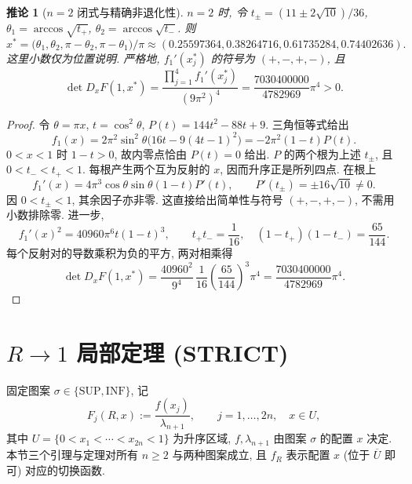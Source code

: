 \documentclass[UTF8]{ctexart}
\newtheorem{corollary}[theorem]{推论}
\begin{document}
\begin{corollary}[$n=2$ 闭式与精确非退化性]\label{cor:r1n2}
$n=2$ 时, 令 $t_\pm=(11\pm2\sqrt{10})/36$,
$\theta_1=\arccos\sqrt{t_+}$, $\theta_2=\arccos\sqrt{t_-}$. 则
\begin{equation*}
x^*=\bigl(\theta_1,\theta_2,\pi-\theta_2,\pi-\theta_1\bigr)/\pi
\approx(0.25597364,0.38264716,0.61735284,0.74402636).
\end{equation*}
这里小数仅为位置说明. 严格地, $f_1'(x_j^*)$ 的符号为 $(+,-,+,-)$, 且
\begin{equation}\label{eq:n2det-exact}
\det D_xF(1,x^*)=\frac{\prod_{j=1}^4 f_1'(x_j^*)}{(9\pi^2)^4}
=\frac{7030400000}{4782969}\pi^4>0.
\end{equation}
\end{corollary}
\begin{proof}
令 $\theta=\pi x$, $t=\cos^2\theta$, $P(t)=144t^2-88t+9$. 三角恒等式给出
\begin{equation*}
f_1(x)=2\pi^2\sin^2\theta\bigl(16t-9(4t-1)^2\bigr)
=-2\pi^2(1-t)P(t).
\end{equation*}
$0<x<1$ 时 $1-t>0$, 故内零点恰由 $P(t)=0$ 给出.
$P$ 的两个根为上述 $t_\pm$, 且 $0<t_-<t_+<1$. 每根产生两个互为反射的
$x$, 因而升序正是所列四点. 在根上
\begin{equation*}
f_1'(x)=4\pi^3\cos\theta\sin\theta(1-t)P'(t),\qquad
P'(t_\pm)=\pm16\sqrt{10}\ne0.
\end{equation*}
因 $0<t_\pm<1$, 其余因子亦非零. 这直接给出简单性与符号 $(+,-,+,-)$,
不需用小数排除零. 进一步,
\begin{equation*}
f_1'(x)^2=40960\pi^6 t(1-t)^3,\qquad
t_+t_-=\frac1{16},\quad (1-t_+)(1-t_-)=\frac{65}{144}.
\end{equation*}
每个反射对的导数乘积为负的平方, 两对相乘得
\begin{equation*}
\det D_xF(1,x^*)=
\frac{40960^2}{9^4}\,\frac1{16}\left(\frac{65}{144}\right)^3\pi^4
=\frac{7030400000}{4782969}\pi^4.
\end{equation*}
\end{proof}

\section{\texorpdfstring{$R\to1$}{R to 1} 局部定理 (STRICT)}\label{sec:local}

固定图案 $\sigma\in\{\mathrm{SUP},\mathrm{INF}\}$, 记
\begin{equation*}
	F_j(R,x):=\frac{f(x_j)}{\lambda_{n+1}},\qquad
	j=1,\dots,2n,\quad x\in U,
\end{equation*}
其中 $U=\{0<x_1<\cdots<x_{2n}<1\}$ 为升序区域, $f,\lambda_{n+1}$ 由图案
$\sigma$ 的配置 $x$ 决定. 本节三个引理与定理对所有 $n\ge2$ 与两种图案成立,
且 $f_R$ 表示配置 $x$ (位于 $\overline U$ 即可) 对应的切换函数.
\end{document}
